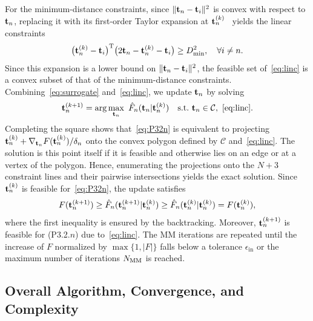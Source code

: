 \documentclass[journal]{IEEEtran}
\begin{document}
For the minimum-distance constraints, since $\|\mathbf{t}_n-\mathbf{t}_i\|^2$ is convex with respect to $\mathbf{t}_n$, replacing it with its first-order Taylor expansion at $\mathbf{t}_n^{(k)}$~\cite{ZhengTCOM2025} yields the linear constraints
\begin{equation}\label{eq:linc}
\big(\mathbf{t}_n^{(k)}-\mathbf{t}_i\big)^{\mathrm T}\big(2\mathbf{t}_n-\mathbf{t}_n^{(k)}-\mathbf{t}_i\big)\ge D_{\min}^2,\quad\forall i\neq n.
\end{equation}
Since this expansion is a lower bound on $\|\mathbf{t}_n-\mathbf{t}_i\|^2$, the feasible set of~\eqref{eq:linc} is a convex subset of that of the minimum-distance constraints. Combining~\eqref{eq:surrogate} and~\eqref{eq:linc}, we update $\mathbf{t}_n$ by solving
\begin{equation}\label{eq:P32n}
\bt_n^{(k+1)}=\arg\max_{\bt_n}\ \hat F_n(\bt_n|\bt_n^{(k)})\quad\mathrm{s.t.}\ \bt_n\in\mathcal C,\ \eqref{eq:linc}.
\end{equation}
Completing the square shows that~\eqref{eq:P32n} is equivalent to projecting $\mathbf{t}_n^{(k)}+\nabla_{\mathbf{t}_n}F(\mathbf{t}_n^{(k)})/\delta_n$ onto the convex polygon defined by $\mathcal C$ and~\eqref{eq:linc}. The solution is this point itself if it is feasible and otherwise lies on an edge or at a vertex of the polygon. Hence, enumerating the projections onto the $N+3$ constraint lines and their pairwise intersections yields the exact solution. Since $\mathbf{t}_n^{(k)}$ is feasible for~\eqref{eq:P32n}, the update satisfies
\begin{equation}\label{eq:mono}
F(\mathbf{t}_n^{(k+1)})\ge\hat F_n(\mathbf{t}_n^{(k+1)}|\mathbf{t}_n^{(k)})\ge\hat F_n(\mathbf{t}_n^{(k)}|\mathbf{t}_n^{(k)})=F(\mathbf{t}_n^{(k)}),
\end{equation}
where the first inequality is ensured by the backtracking. Moreover, $\mathbf{t}_n^{(k+1)}$ is feasible for (P3.2.$n$) due to~\eqref{eq:linc}. The MM iterations are repeated until the increase of $F$ normalized by $\max\{1,|F|\}$ falls below a tolerance $\epsilon_{\mathrm{in}}$ or the maximum number of iterations $N_{\mathrm{MM}}$ is reached.

\subsection{Overall Algorithm, Convergence, and Complexity}\label{sec:overall}
\end{document}
